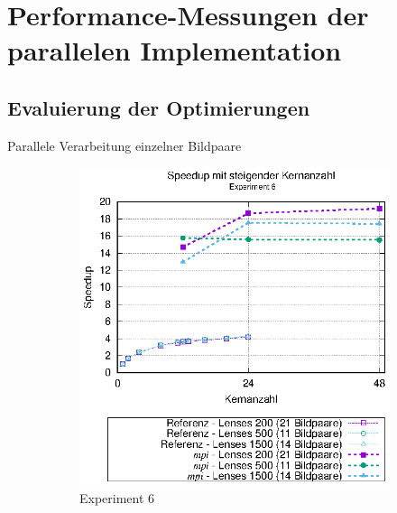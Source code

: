 \section{Performance-Messungen der parallelen Implementation}

\subsection{Evaluierung der Optimierungen}

\begin{frame}[allowframebreaks]{Parallele Verarbeitung einzelner Bildpaare}
	\begin{figure}[h]
		\begin{subfigure}[b]{0.47\textwidth}
			\centering
			\includegraphics[width=\textwidth]{pdf/mpi_speedup_exp6}
			\caption{Experiment 6}
		\end{subfigure}
		\hfill
		\begin{subfigure}[b]{0.47\textwidth}
			\centering

\end{subfigure}
\end{figure}
\end{frame}
